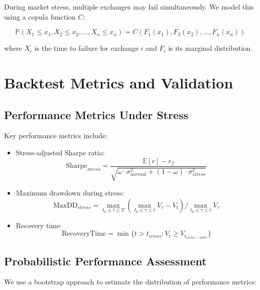 \documentclass{article}
\begin{document}
During market stress, multiple exchanges may fail simultaneously. We model this using a copula function $C$:

\begin{equation}
\mathbb{P}(X_1 \leq x_1, X_2 \leq x_2, \ldots, X_n \leq x_n) = C(F_1(x_1), F_2(x_2), \ldots, F_n(x_n))
\end{equation}

where $X_i$ is the time to failure for exchange $i$ and $F_i$ is its marginal distribution.

\section{Backtest Metrics and Validation}

\subsection{Performance Metrics Under Stress}

Key performance metrics include:

\begin{itemize}
    \item Stress-adjusted Sharpe ratio:
    \begin{equation}
    \text{Sharpe}_{stress} = \frac{\mathbb{E}[r] - r_f}{\sqrt{\omega \cdot \sigma^2_{normal} + (1-\omega) \cdot \sigma^2_{stress}}}
    \end{equation}
    
    \item Maximum drawdown during stress:
    \begin{equation}
    \text{MaxDD}_{stress} = \max_{t_0 \leq t \leq T} \left( \max_{t_0 \leq \tau \leq t} V_{\tau} - V_t \right) / \max_{t_0 \leq \tau \leq t} V_{\tau}
    \end{equation}
    
    \item Recovery time:
    \begin{equation}
    \text{RecoveryTime} = \min \{t > t_{crisis} : V_t \geq V_{t_{crisis-start}} \}
    \end{equation}
\end{itemize}

\subsection{Probabilistic Performance Assessment}

We use a bootstrap approach to estimate the distribution of performance metrics:
\end{document}
